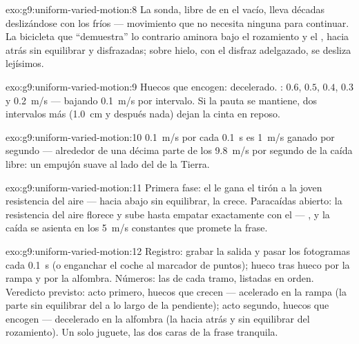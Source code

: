 \begin{solution}{exo:g9:uniform-varied-motion:8}
La sonda, libre de  en el vacío, lleva décadas deslizándose con
los  fríos --- movimiento que no necesita ninguna
 para continuar. La bicicleta que ``demuestra'' lo
contrario aminora bajo el rozamiento y el ,
 hacia atrás sin equilibrar y disfrazadas; sobre hielo,
con el disfraz adelgazado, se desliza lejísimos.
\end{solution}

\begin{solution}{exo:g9:uniform-varied-motion:9}
Huecos que encogen: decelerado. : $0.6$, $0.5$, $0.4$,
$0.3$ y \qty{0.2}{m/s} --- bajando \qty{0.1}{m/s} por intervalo. Si la
pauta se mantiene, dos intervalos más (\qty{1.0}{cm} y después nada)
dejan la cinta en reposo.
\end{solution}

\begin{solution}{exo:g9:uniform-varied-motion:10}
\qty{0.1}{m/s} por cada \qty{0.1}{s} es \qty{1}{m/s} ganado por segundo
--- alrededor de una décima parte de los \qty{9.8}{m/s} por segundo de
la caída libre: un empujón suave al lado del de la Tierra.
\end{solution}

\begin{solution}{exo:g9:uniform-varied-motion:11}
Primera fase: el  le gana el tirón a la joven resistencia del
aire ---  hacia abajo sin equilibrar, la
 crece. Paracaídas abierto: la resistencia del
aire florece y sube hasta empatar exactamente con el
 ---  , y la caída se asienta
en los \qty{5}{m/s} constantes que promete la frase.
\end{solution}

\begin{solution}{exo:g9:uniform-varied-motion:12}
Registro: grabar la salida y pasar los fotogramas cada \qty{0.1}{s} (o
enganchar el coche al marcador de puntos);  hueco tras hueco
por la rampa y por la alfombra. Números: las  de cada
tramo, listadas en orden. Veredicto previsto: acto primero, huecos que
crecen --- acelerado en la rampa (la parte sin equilibrar del
 a lo largo de la pendiente); acto segundo, huecos que encogen
--- decelerado en la alfombra (la  hacia atrás y sin
equilibrar del rozamiento). Un solo juguete, las dos caras de la frase
tranquila.
\end{solution}

